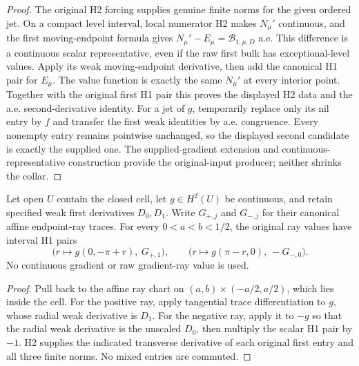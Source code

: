 \begin{proof}
\leanok
The original H2 forcing supplies genuine finite norms for the given ordered jet.
On a compact level interval, local numerator H2 makes $N_\mu'$ continuous,
and the first moving-endpoint formula gives
$N_\mu'-E_\mu=\mathcal B_{1,\mu,D}$ a.e.
This difference is a continuous scalar representative, even if the raw first
bulk has exceptional-level values.
Apply its weak moving-endpoint derivative, then add the canonical H1 pair
for $E_\mu$. The value function is exactly the same $N_\mu'$ at every
interior point. Together with the original first H1 pair this proves the
displayed H2 data and the a.e. second-derivative identity.
For a jet of $g$, temporarily replace only its nil entry by $f$ and transfer
the first weak identities by a.e. congruence. Every nonempty entry remains
pointwise unchanged, so the displayed second candidate is exactly the supplied one.
The supplied-gradient extension and continuous-representative construction
provide the original-input producer; neither shrinks the collar.
\end{proof}

\begin{lemma}
\label{lem:quarter-ray-tangential-derivative}
\leanok
Let open $U$ contain the closed cell, let $g\in H^2(U)$ be continuous,
and retain specified weak first derivatives $D_0,D_1$.
Write $G_{+,j}$ and $G_{-,j}$ for their canonical affine endpoint-ray traces.
For every $0<a<b<1/2$, the original ray values have interval H1 pairs
\[
 \bigl(r\mapsto g(0,-\pi+r),\ G_{+,1}\bigr),\qquad
 \bigl(r\mapsto g(\pi-r,0),\ -G_{-,0}\bigr).
\]
No continuous gradient or raw gradient-ray value is used.
\end{lemma}

\begin{proof}
\leanok
Pull back to the affine ray chart on
$(a,b)\times(-a/2,a/2)$, which lies inside the cell.
For the positive ray, apply tangential trace differentiation to $g$,
whose radial weak derivative is $D_1$.
For the negative ray, apply it to $-g$ so that the radial weak derivative
is the unscaled $D_0$, then multiply the scalar H1 pair by $-1$.
H2 supplies the indicated transverse derivative of each original first entry
and all three finite norms. No mixed entries are commuted.
\end{proof}

